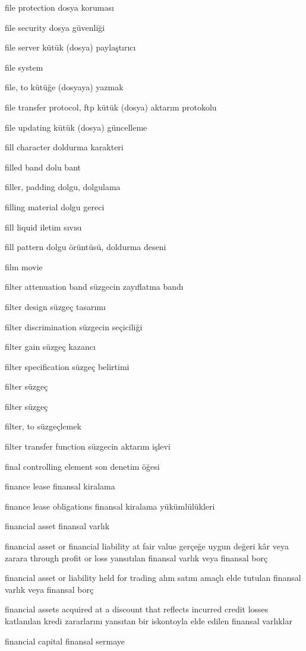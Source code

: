 \documentclass[12pt,fleqn]{article}\usepackage{../../common}
\begin{document}
file protection dosya koruması

file security dosya güvenliği

file server kütük (dosya) paylaştırıcı

file system

file, to kütüğe (dosyaya) yazmak

file transfer protocol, ftp kütük (dosya) aktarım protokolu

file updating kütük (dosya) güncelleme

fill character doldurma karakteri

filled band dolu bant

filler, padding dolgu, dolgulama

filling material dolgu gereci

fill liquid iletim sıvısı

fill pattern dolgu örüntüsü, doldurma deseni

film movie

filter attenuation band süzgecin zayıflatma bandı

filter design süzgeç tasarımı

filter discrimination süzgecin seçiciliği

filter gain süzgeç kazancı

filter specification süzgeç belirtimi

filter süzgeç

filter süzgeç

filter, to süzgeçlemek

filter transfer function süzgecin aktarım işlevi

final controlling element son denetim öğesi

finance lease finansal kiralama

finance lease obligations finansal kiralama yükümlülükleri

financial asset finansal varlık

financial asset or financial liability at fair value gerçeğe uygun değeri kâr veya zarara through profit or loss yansıtılan finansal varlık veya finansal borç

financial asset or liability held for trading alım satım amaçlı elde tutulan finansal varlık veya finansal borç

financial assets acquired at a discount that reflects incurred credit losses katlanılan kredi zararlarını yansıtan bir iskontoyla elde edilen finansal varlıklar

financial capital finansal sermaye
\end{document}
